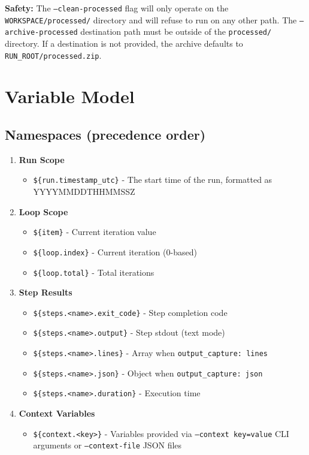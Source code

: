 \documentclass[11pt,a4paper]{article}
\begin{document}
\textbf{Safety:} The \texttt{--clean-processed} flag will only operate on the \texttt{WORKSPACE/processed/} directory and will refuse to run on any other path. The \texttt{--archive-processed} destination path must be outside of the \texttt{processed/} directory. If a destination is not provided, the archive defaults to \texttt{RUN\_ROOT/processed.zip}.

\section{Variable Model}

\subsection{Namespaces (precedence order)}

\begin{enumerate}
    \item \textbf{Run Scope}
    \begin{itemize}
        \item \texttt{\$\{run.timestamp\_utc\}} - The start time of the run, formatted as YYYYMMDDTHHMMSSZ
    \end{itemize}
    
    \item \textbf{Loop Scope}
    \begin{itemize}
        \item \texttt{\$\{item\}} - Current iteration value
        \item \texttt{\$\{loop.index\}} - Current iteration (0-based)
        \item \texttt{\$\{loop.total\}} - Total iterations
    \end{itemize}
    
    \item \textbf{Step Results}
    \begin{itemize}
        \item \texttt{\$\{steps.<name>.exit\_code\}} - Step completion code
        \item \texttt{\$\{steps.<name>.output\}} - Step stdout (text mode)
        \item \texttt{\$\{steps.<name>.lines\}} - Array when \texttt{output\_capture: lines}
        \item \texttt{\$\{steps.<name>.json\}} - Object when \texttt{output\_capture: json}
        \item \texttt{\$\{steps.<name>.duration\}} - Execution time
    \end{itemize}
    
    \item \textbf{Context Variables}
    \begin{itemize}
        \item \texttt{\$\{context.<key>\}} - Variables provided via \texttt{--context key=value} CLI arguments or \texttt{--context-file} JSON files
    \end{itemize}
\end{enumerate}
\end{document}
